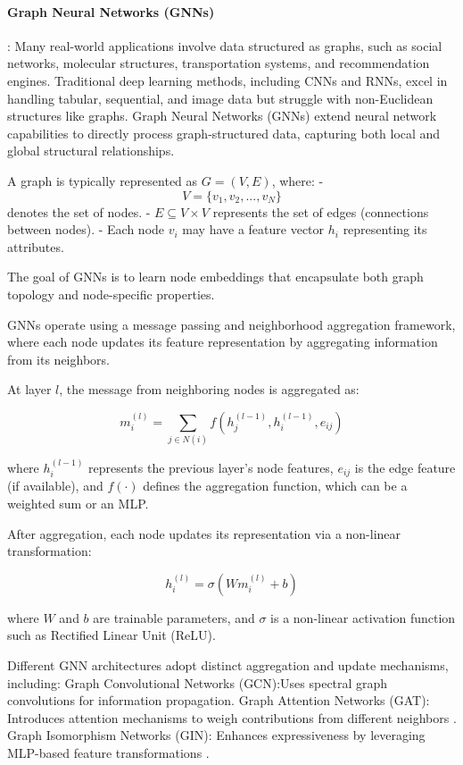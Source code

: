 \documentclass[acmsmall]{acmart}
\begin{document}
\paragraph{Graph Neural Networks (GNNs)}: Many real-world applications involve data structured as graphs, such as social networks, molecular structures, transportation systems, and recommendation engines. Traditional deep learning methods, including CNNs \cite{lecun1998cnn} and RNNs, excel in handling tabular, sequential, and image data but struggle with non-Euclidean structures like graphs. Graph Neural Networks (GNNs) \cite{scarselli2009gnn} extend neural network capabilities to directly process graph-structured data, capturing both local and global structural relationships.

A graph is typically represented as $G = (V, E)$, where:
- $$V = \{v_1, v_2, ..., v_N\}$$ denotes the set of nodes.
- $E \subseteq V \times V$ represents the set of edges (connections between nodes).
- Each node $v_i$ may have a feature vector $h_i$ representing its attributes.

The goal of GNNs is to learn node embeddings that encapsulate both graph topology and node-specific properties.

GNNs operate using a message passing and neighborhood aggregation framework, where each node updates its feature representation by aggregating information from its neighbors.

At layer $l$, the message from neighboring nodes is aggregated as:

\begin{equation}
m_i^{(l)} = \sum_{j \in N(i)} f(h_j^{(l-1)}, h_i^{(l-1)}, e_{ij})
\end{equation}

where $h_i^{(l-1)}$ represents the previous layer’s node features, $e_{ij}$ is the edge feature (if available), and $f(\cdot)$ defines the aggregation function, which can be a weighted sum or an MLP.

After aggregation, each node updates its representation via a non-linear transformation:

\begin{equation}
h_i^{(l)} = \sigma(W m_i^{(l)} + b)
\end{equation}

where $W$ and $b$ are trainable parameters, and $\sigma$ is a non-linear activation function such as Rectified Linear Unit (ReLU).

Different GNN architectures adopt distinct aggregation and update mechanisms, including:
Graph Convolutional Networks (GCN):Uses spectral graph convolutions for information propagation\cite{kipf2017gcn}.
Graph Attention Networks (GAT): Introduces attention mechanisms to weigh contributions from different neighbors \cite{velickovic2018gat}.
Graph Isomorphism Networks (GIN): Enhances expressiveness by leveraging MLP-based feature transformations \cite{xu2019gin}.
\end{document}
